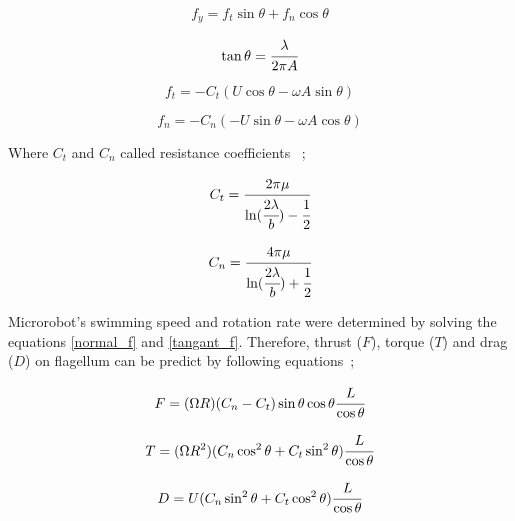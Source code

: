\documentclass[12pt,a4paper,titlepage]{report}
\begin{document}
\begin{equation}
 f_y = f_t\sin \theta + f_n\cos \theta
\label{tangant}
\end{equation}

\begin{equation}
 \tan \theta  = \cfrac{\lambda}{2\pi A}
\label{tang}
\end{equation}



\begin{equation}
 f_t = -C_t(U \cos \theta - \omega A \sin \theta)
\label{normal_f}
\end{equation}



\begin{equation}
f_n = - C_n(-U \sin \theta - \omega A \cos \theta)
\label{tangant_f}
\end{equation}

Where $C_t$ and $C_n$ called resistance coefficients ~\citep{edd2003biomimetic};
 

\begin{equation}
 C_t = \cfrac{2 \pi \mu}{\ln (\cfrac{2 \lambda}{b}) - \cfrac{1}{2}}
\label{Coeffient1}
\end{equation}



\begin{equation}
 C_n = \cfrac{4 \pi \mu}{\ln (\cfrac{2 \lambda}{b}) + \cfrac{1}{2}}
\label{Coeffient1}
\end{equation}

Microrobot\rq{}s swimming speed and rotation rate were determined by solving 
the equations \ref{normal_f} and \ref{tangant_f}. Therefore, thrust ($F$), torque ($T$) and drag ($D$) 
on flagellum can be predict by following equations~\citep{rodenborn2013propulsion};

\begin{equation}
 F = (\Omega R)(C_n - C_t) \sin \theta \cos \theta \cfrac{L}{\cos \theta} 
\label{thrust}
\end{equation}

\begin{equation}
 T = (\Omega R^2)(C_n \cos ^2 \theta + C_t \sin ^2 \theta) \cfrac{L}{\cos \theta}
\label{torque}
\end{equation}

\begin{equation}
 D = U (C_n \sin ^2 \theta + C_t \cos ^2 \theta) \cfrac{L}{\cos \theta} 
\label{drag}
\end{equation}
\end{document}
